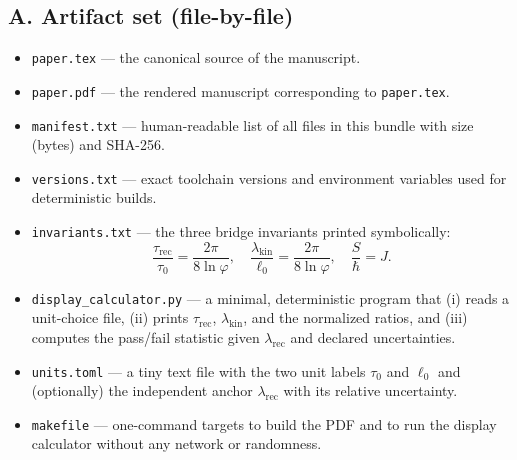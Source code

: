 \documentclass[11pt]{article}
\begin{document}
\subsection*{A. Artifact set (file-by-file)}
\begin{itemize}
  \item \texttt{paper.tex} — the canonical source of the manuscript.
  \item \texttt{paper.pdf} — the rendered manuscript corresponding to \texttt{paper.tex}.
  \item \texttt{manifest.txt} — human-readable list of all files in this bundle with size (bytes) and SHA-256.
  \item \texttt{versions.txt} — exact toolchain versions and environment variables used for deterministic builds.
  \item \texttt{invariants.txt} — the three bridge invariants printed symbolically:
  \[
  \frac{\tau_{\mathrm{rec}}}{\tau_{0}}=\frac{2\pi}{8\ln\varphi},\quad
  \frac{\lambda_{\mathrm{kin}}}{\ell_{0}}=\frac{2\pi}{8\ln\varphi},\quad
  \frac{S}{\hbar}=J.
  \]
  \item \texttt{display\_calculator.py} — a minimal, deterministic program that (i) reads a unit-choice file, (ii) prints \(\tau_{\mathrm{rec}}\), \(\lambda_{\mathrm{kin}}\), and the normalized ratios, and (iii) computes the pass/fail statistic given \(\lambda_{\mathrm{rec}}\) and declared uncertainties.
  \item \texttt{units.toml} — a tiny text file with the two unit labels \(\tau_{0}\) and \(\ell_{0}\) and (optionally) the independent anchor \(\lambda_{\mathrm{rec}}\) with its relative uncertainty.
  \item \texttt{makefile} — one-command targets to build the PDF and to run the display calculator without any network or randomness.
\end{itemize}
\end{document}
